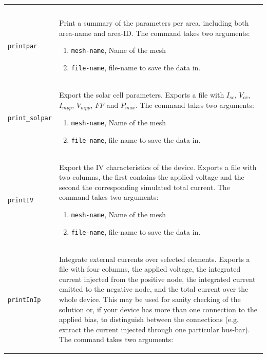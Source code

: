 \documentclass[noshowpacs,preprintnumbers,amsmath,amssymb, letter]{revtex4}
\begin{document}
\begin{longtable}{p{}p{}}
\begin{tabular}{ccccccccccc}
	\multicolumn{2}{l}{\texttt{<empty line>}}\\
\end{tabular}\\
\texttt{printpar}	& Print a summary of the parameters per area, including both area-name and area-ID. The command takes two arguments:
\begin{enumerate}
\item \texttt{mesh-name}, Name of the mesh
\item \texttt{file-name}, file-name to save the data in.
\end{enumerate}\\
\texttt{print\_solpar}		& Export the solar cell parameters. Exports a file with $I_{sc}$, $V_{oc}$, $I_{mpp}$, $V_{mpp}$, $FF$ and $P_{max}$. The command takes two arguments:
\begin{enumerate}
\item \texttt{mesh-name}, Name of the mesh
\item \texttt{file-name}, file-name to save the data in.
\end{enumerate}\\
\texttt{printIV}		& Export the IV characteristics of the device. Exports a file with two columns, the first contains the applied voltage and the second the corresponding simulated total current. The command takes two arguments:
\begin{enumerate}
\item \texttt{mesh-name}, Name of the mesh
\item \texttt{file-name}, file-name to save the data in.
\end{enumerate}\\
\texttt{printInIp}		& Integrate external currents over selected elements. Exports a file with four columns, the applied voltage, the integrated current injected from the positive node, the integrated current emitted to the negative node, and the total current over the whole device. This may be used for sanity checking of the solution or, if your device has more than one connection to the applied bias, to distinguish between the connections (e.g. extract the current injected through one particular bus-bar). The command takes two arguments:
\begin{enumerate}

\end{enumerate}
\end{longtable}
\end{document}
